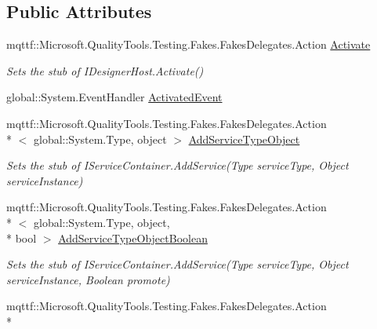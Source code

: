 \subsection*{Public Attributes}
\begin{DoxyCompactItemize}
\item 
mqttf\-::\-Microsoft.\-Quality\-Tools.\-Testing.\-Fakes.\-Fakes\-Delegates.\-Action \hyperlink{class_system_1_1_component_model_1_1_design_1_1_serialization_1_1_fakes_1_1_stub_i_designer_loader_host_a596e86b071bb232da159c70bc74e1f2e}{Activate}
\begin{DoxyCompactList}\small\item\em Sets the stub of I\-Designer\-Host.\-Activate()\end{DoxyCompactList}\item 
global\-::\-System.\-Event\-Handler \hyperlink{class_system_1_1_component_model_1_1_design_1_1_serialization_1_1_fakes_1_1_stub_i_designer_loader_host_a6d279cedb0a7700092fdff5617efd9a9}{Activated\-Event}
\item 
mqttf\-::\-Microsoft.\-Quality\-Tools.\-Testing.\-Fakes.\-Fakes\-Delegates.\-Action\\*
$<$ global\-::\-System.\-Type, object $>$ \hyperlink{class_system_1_1_component_model_1_1_design_1_1_serialization_1_1_fakes_1_1_stub_i_designer_loader_host_a491b05c45fb73521e733771dd4ab9e1e}{Add\-Service\-Type\-Object}
\begin{DoxyCompactList}\small\item\em Sets the stub of I\-Service\-Container.\-Add\-Service(\-Type service\-Type, Object service\-Instance)\end{DoxyCompactList}\item 
mqttf\-::\-Microsoft.\-Quality\-Tools.\-Testing.\-Fakes.\-Fakes\-Delegates.\-Action\\*
$<$ global\-::\-System.\-Type, object, \\*
bool $>$ \hyperlink{class_system_1_1_component_model_1_1_design_1_1_serialization_1_1_fakes_1_1_stub_i_designer_loader_host_aa42e2e725359e609ac35fc41ee775349}{Add\-Service\-Type\-Object\-Boolean}
\begin{DoxyCompactList}\small\item\em Sets the stub of I\-Service\-Container.\-Add\-Service(\-Type service\-Type, Object service\-Instance, Boolean promote)\end{DoxyCompactList}\item 
mqttf\-::\-Microsoft.\-Quality\-Tools.\-Testing.\-Fakes.\-Fakes\-Delegates.\-Action\\*

\end{DoxyCompactItemize}

